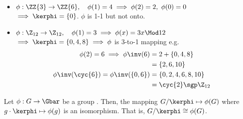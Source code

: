   \begin{examples}
    \begin{itemize}
      \item \(\phi:\ZZ{3}\to\ZZ{6}, \quad\phi(1) = 4 \implies \phi(2)=2,\ \phi(0)=0\) \\
      \(\implies\kerphi = \{0\}\). \(\phi\) is 1-1 but not onto.
      \item \(\phi:\Z_{12}\to\Z_{12}, \quad \phi(1)=3 \implies \phi(x)=3x \Mod 12\) \\
      \(\implies \kerphi = \{0, 4, 8\}\implies \phi\) is 3-to-1 mapping
      e.g. \begin{align*}
        \phi(2) = 6\implies \phi\inv(6) &= 2+\{0, 4, 8\} \\
        &= \{2,6,10\} \\
        \phi\inv(\cyc{6}) = \phi\inv(\{0,6\}) &= \{0,2,4,6,8,10\} \\
        &= \cyc{2} \sgp \Z_{12}
      \end{align*}
    \end{itemize}
  \end{examples}

  \begin{theorem}
      Let \(\phi:G\to\Gbar\) be a group \homo. Then, the mapping \(G/\kerphi\mapsto \phi(G)\) where \(g\cdot\kerphi\mapsto \phi(g)\) is an isomorphism. That is, \(G/\kerphi\cong \phi(G)\).
  \end{theorem}